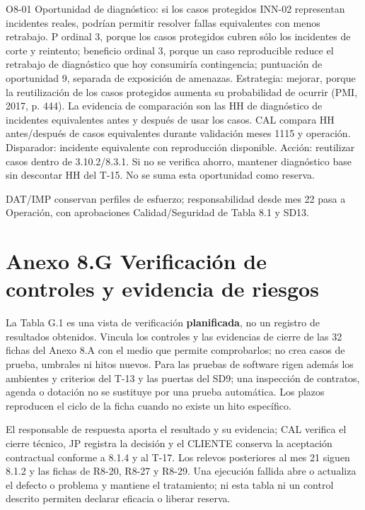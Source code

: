 O8-01 \textemdash{} Oportunidad de diagnóstico: si los casos protegidos INN-02 representan incidentes reales, podrían permitir resolver fallas equivalentes con menos retrabajo. P ordinal 3, porque los casos protegidos cubren sólo los incidentes de corte y reintento; beneficio ordinal 3, porque un caso reproducible reduce el retrabajo de diagnóstico que hoy consumiría contingencia; puntuación de oportunidad 9, separada de exposición de amenazas. Estrategia: mejorar, porque la reutilización de los casos protegidos aumenta su probabilidad de ocurrir (PMI, 2017, p. 444). La evidencia de comparación son las HH de diagnóstico de incidentes equivalentes antes y después de usar los casos. CAL compara HH antes/después de casos equivalentes durante validación meses 11\textendash{}15 y operación. Disparador: incidente equivalente con reproducción disponible. Acción: reutilizar casos dentro de 3.10.2/8.3.1. Si no se verifica ahorro, mantener diagnóstico base sin descontar HH del T-15. No se suma esta oportunidad como reserva.

DAT/IMP conservan perfiles de esfuerzo; responsabilidad desde mes 22 pasa a Operación, con aprobaciones Calidad/Seguridad de Tabla 8.1 y SD13.

\clearpage
\section*{Anexo 8.G \textemdash{} Verificación de controles y evidencia de riesgos}

La Tabla G.1 es una vista de verificación \textbf{planificada}, no un registro de resultados obtenidos. Vincula los controles y las evidencias de cierre de las 32 fichas del Anexo 8.A con el medio que permite comprobarlos; no crea casos de prueba, umbrales ni hitos nuevos. Para las pruebas de software rigen además los ambientes y criterios del T-13 y las puertas del SD9; una inspección de contratos, agenda o dotación no se sustituye por una prueba automática. Los plazos reproducen el ciclo de la ficha cuando no existe un hito específico.

El responsable de respuesta aporta el resultado y su evidencia; CAL verifica el cierre técnico, JP registra la decisión y el CLIENTE conserva la aceptación contractual conforme a 8.1.4 y al T-17. Los relevos posteriores al mes 21 siguen 8.1.2 y las fichas de R8-20, R8-27 y R8-29. Una ejecución fallida abre o actualiza el defecto o problema y mantiene el tratamiento; ni esta tabla ni un control descrito permiten declarar eficacia o liberar reserva.

